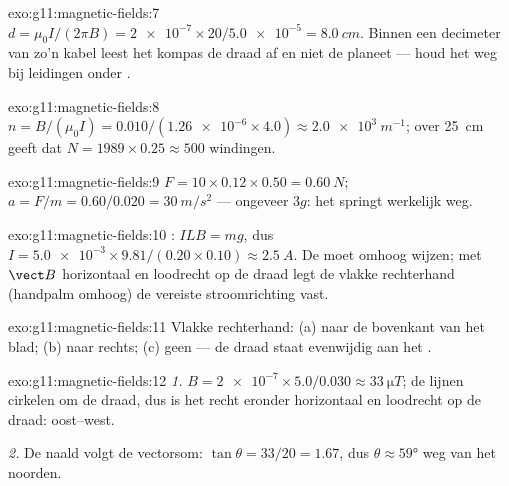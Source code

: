 \begin{solution}{exo:g11:magnetic-fields:7}
$d = \mu_0 I / (2\pi B) = \num{2e-7} \times 20 / \num{5.0e-5}
= \qty{8.0}{cm}$. Binnen een decimeter van zo'n kabel leest het kompas de
draad af en niet de planeet --- houd het weg bij leidingen onder
.
\end{solution}

\begin{solution}{exo:g11:magnetic-fields:8}
$n = B/(\mu_0 I) = 0.010 / (\num{1.26e-6} \times 4.0)
\approx \qty{2.0e3}{m^{-1}}$; over \qty{25}{cm} geeft dat
$N = 1989 \times 0.25 \approx 500$ windingen.
\end{solution}

\begin{solution}{exo:g11:magnetic-fields:9}
$F = 10 \times 0.12 \times 0.50 = \qty{0.60}{N}$;
$a = F/m = 0.60/0.020 = \qty{30}{m/s^2}$ --- ongeveer $3g$: het 
springt werkelijk weg.
\end{solution}

\begin{solution}{exo:g11:magnetic-fields:10}
: $ILB = mg$, dus
$I = \num{5.0e-3} \times 9.81 / (0.20 \times 0.10) \approx
\qty{2.5}{A}$. De  moet omhoog wijzen; met $\vect B$ horizontaal en
loodrecht op de draad legt de vlakke rechterhand (handpalm omhoog) de
vereiste stroomrichting vast.
\end{solution}

\begin{solution}{exo:g11:magnetic-fields:11}
Vlakke rechterhand: (a) naar de bovenkant van het blad; (b) naar rechts;
(c) geen  --- de draad staat evenwijdig aan het .
\end{solution}

\begin{solution}{exo:g11:magnetic-fields:12}
\emph{1.} $B = \num{2e-7} \times 5.0 / 0.030 \approx
\qty{33}{\micro T}$; de lijnen cirkelen om de draad, dus is het 
recht eronder horizontaal en loodrecht op de draad: oost--west.

\emph{2.} De naald volgt de vectorsom: $\tan\theta = 33/20 = 1.67$, dus
$\theta \approx \ang{59}$ weg van het noorden.
\end{solution}

